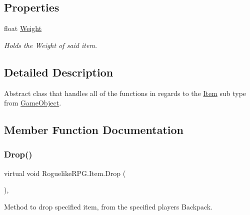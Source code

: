 \subsection*{Properties}
\begin{DoxyCompactItemize}
\item 
float \mbox{\hyperlink{class_roguelike_r_p_g_1_1_item_a3b805eda54cfe72ae368244ab07dda75}{Weight}}
\begin{DoxyCompactList}\small\item\em Holds the Weight of said item. \end{DoxyCompactList}\end{DoxyCompactItemize}


\subsection{Detailed Description}
Abstract class that handles all of the functions in regards to the \mbox{\hyperlink{class_roguelike_r_p_g_1_1_item}{Item}} sub type from \mbox{\hyperlink{class_roguelike_r_p_g_1_1_game_object}{Game\+Object}}. 



\subsection{Member Function Documentation}
\mbox{\label{class_roguelike_r_p_g_1_1_item_ae46e19cf36347b93f56704516c0c6618}} 
\subsubsection{\texorpdfstring{Drop()}{Drop()}}
{\footnotesize\ttfamily virtual void Roguelike\+R\+P\+G.\+Item.\+Drop (\begin{DoxyParamCaption}{ }\end{DoxyParamCaption})\hspace{0.3cm}{\ttfamily [inline]}, {\ttfamily [virtual]}}



Method to drop specified item, from the specified player\textquotesingle{}s Backpack. 

\mbox{\label{class_roguelike_r_p_g_1_1_item_accf1844a3b2b53b75d8974ba14509c82}} 
